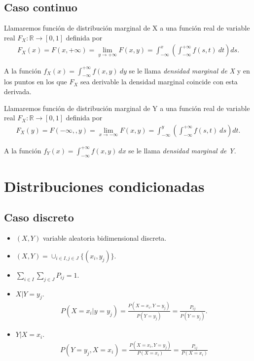 \subsection{Caso continuo}
\begin{defi}
    Llamaremos función de distribución marginal de X a una función real de variable real $F_X : \mathbb{R} \longrightarrow [0,1]$ definida por
    \begin{align*}
        F_X(x) = F(x,+\infty) = \lim_{y \to +\infty}{F(x,y)} = \int_{-\infty}^{x}{\left(\int_{-\infty}^{+\infty}{f(s,t) \ dt }\right) ds}.
    \end{align*}
\end{defi}
A la función $f_X(x) = \int_{-\infty}^{+\infty}{f(x,y) \ dy}$ se le llama \textit{densidad marginal de X} y en los puntos en los que $F_X$ sea derivable la densidad marginal coincide con esta derivada.

\begin{defi}
    Llamaremos función de distribución marginal de Y a una función real de variable real $F_X : \mathbb{R} \longrightarrow [0,1]$ definida por
    \begin{align*}
        F_X(y) = F(-\infty,,y) = \lim_{x \to -\infty}{F(x,y)} = \int_{-\infty}^{y}{\left(\int_{-\infty}^{+\infty}{f(s,t) \ ds }\right) dt}.
    \end{align*}
\end{defi}
A la función $f_Y(x) = \int_{-\infty}^{+\infty}{f(x,y) \ dx}$ se le llama \textit{densidad marginal de Y}.

\section{Distribuciones condicionadas}

\subsection{Caso discreto}
\begin{itemize}
    \item $(X,Y)$ variable aleatoria bidimensional discreta.
    \item $(X,Y) = \cup_{i \in I, j \in J}{\{(x_i,y_j)\}}$.
    \item $\sum_{i \in I}{\sum_{j \in J}{P_{ij}}} = 1$.
    \item $X | Y = y_j$.
          \begin{align*}
              P(X = x_i | y = y_j) = \frac{P(X = x_i, Y = y_j)}{P(Y = y_j)} = \frac{P_{ij}}{P(Y = y_j)}.
          \end{align*}
    \item $Y | X = x_i$.
          \begin{align*}
              P(Y = y_j, X = x_i) = \frac{P(X = x_i, Y = y_j)}{P(X = x_i)} = \frac{P_{ij}}{P(X = x_i)}
          \end{align*}
\end{itemize}
